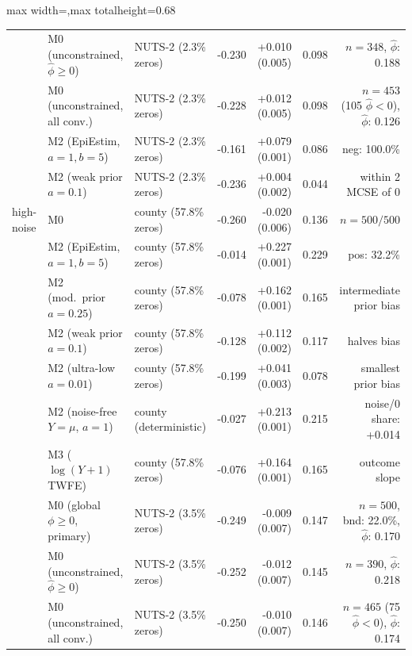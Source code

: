 \begin{table}[!t]
\begin{adjustbox}{max width=\linewidth,max totalheight=0.68\textheight}
\begin{tabular}{llrrrrrrrrrr}
 & M0 (unconstrained, $\hat\phi\ge 0$) & \multicolumn{2}{l}{NUTS-2 (2.3\% zeros)} & -0.230 & +0.010 (0.005) & 0.098 & \multicolumn{5}{r}{$n=348$, $\hat\phi$: 0.188} \\
 & M0 (unconstrained, all conv.) & \multicolumn{2}{l}{NUTS-2 (2.3\% zeros)} & -0.228 & +0.012 (0.005) & 0.098 & \multicolumn{5}{r}{$n=453$ (105 $\hat\phi<0$), $\hat\phi$: 0.126} \\
 & M2 (EpiEstim, $a=1,b=5$) & \multicolumn{2}{l}{NUTS-2 (2.3\% zeros)} & -0.161 & +0.079 (0.001) & 0.086 & \multicolumn{5}{r}{neg: 100.0\%} \\
 & M2 (weak prior $a=0.1$) & \multicolumn{2}{l}{NUTS-2 (2.3\% zeros)} & -0.236 & +0.004 (0.002) & 0.044 & \multicolumn{5}{r}{within 2 MCSE of 0} \\
high-noise & M0 & \multicolumn{2}{l}{county (57.8\% zeros)} & -0.260 & -0.020 (0.006) & 0.136 & \multicolumn{5}{r}{$n=500/500$} \\
 & M2 (EpiEstim, $a=1,b=5$) & \multicolumn{2}{l}{county (57.8\% zeros)} & -0.014 & +0.227 (0.001) & 0.229 & \multicolumn{5}{r}{pos: 32.2\%} \\
 & M2 (mod.\ prior $a=0.25$) & \multicolumn{2}{l}{county (57.8\% zeros)} & -0.078 & +0.162 (0.001) & 0.165 & \multicolumn{5}{r}{intermediate prior bias} \\
 & M2 (weak prior $a=0.1$) & \multicolumn{2}{l}{county (57.8\% zeros)} & -0.128 & +0.112 (0.002) & 0.117 & \multicolumn{5}{r}{halves bias} \\
 & M2 (ultra-low $a=0.01$) & \multicolumn{2}{l}{county (57.8\% zeros)} & -0.199 & +0.041 (0.003) & 0.078 & \multicolumn{5}{r}{smallest prior bias} \\
 & M2 (noise-free $Y=\mu$, $a=1$) & \multicolumn{2}{l}{county (deterministic)} & -0.027 & +0.213 (0.001) & 0.215 & \multicolumn{5}{r}{noise/0 share: +0.014} \\
 & M3 ($\log(Y+1)$ TWFE) & \multicolumn{2}{l}{county (57.8\% zeros)} & -0.076 & +0.164 (0.001) & 0.165 & \multicolumn{5}{r}{outcome slope} \\
 & M0 (global $\phi\ge 0$, primary) & \multicolumn{2}{l}{NUTS-2 (3.5\% zeros)} & -0.249 & -0.009 (0.007) & 0.147 & \multicolumn{5}{r}{$n=500$, bnd: 22.0\%, $\hat\phi$: 0.170} \\
 & M0 (unconstrained, $\hat\phi\ge 0$) & \multicolumn{2}{l}{NUTS-2 (3.5\% zeros)} & -0.252 & -0.012 (0.007) & 0.145 & \multicolumn{5}{r}{$n=390$, $\hat\phi$: 0.218} \\
 & M0 (unconstrained, all conv.) & \multicolumn{2}{l}{NUTS-2 (3.5\% zeros)} & -0.250 & -0.010 (0.007) & 0.146 & \multicolumn{5}{r}{$n=465$ (75 $\hat\phi<0$), $\hat\phi$: 0.174} \\

\end{tabular}
\end{adjustbox}
\end{table}
